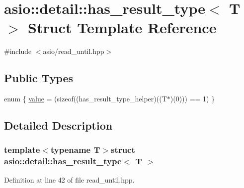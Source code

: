 \hypertarget{structasio_1_1detail_1_1has__result__type}{}\section{asio\+:\+:detail\+:\+:has\+\_\+result\+\_\+type$<$ T $>$ Struct Template Reference}
\label{structasio_1_1detail_1_1has__result__type}


{\ttfamily \#include $<$asio/read\+\_\+until.\+hpp$>$}

\subsection*{Public Types}
\begin{DoxyCompactItemize}
\item 
enum \{ \hyperlink{structasio_1_1detail_1_1has__result__type_a23e57c0d4061f1da9c5947d355433ab7ab080d849fcb6f2a567e83684083ed8f2}{value} = (sizeof((has\+\_\+result\+\_\+type\+\_\+helper)((T$\ast$)(0))) == 1)
 \}
\end{DoxyCompactItemize}


\subsection{Detailed Description}
\subsubsection*{template$<$typename T$>$struct asio\+::detail\+::has\+\_\+result\+\_\+type$<$ T $>$}



Definition at line 42 of file read\+\_\+until.\+hpp.



